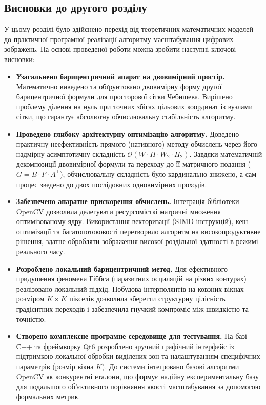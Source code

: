 \subsection{Висновки до другого розділу}

У цьому розділі було здійснено перехід від теоретичних математичних моделей до практичної програмної реалізації алгоритму масштабування цифрових зображень. На основі проведеної роботи можна зробити наступні ключові висновки:

\begin{itemize}
	\item \textbf{Узагальнено барицентричний апарат на двовимірний простір.} Математично виведено та обґрунтовано двовимірну форму другої барицентричної формули для просторової сітки Чебишева. Вирішено проблему ділення на нуль при точних збігах цільових координат із вузлами сітки, що гарантує абсолютну обчислювальну стабільність алгоритму.
	
	\item \textbf{Проведено глибоку архітектурну оптимізацію алгоритму.} Доведено практичну неефективність прямого (нативного) методу обчислень через його надмірну асимптотичну складність $\mathcal{O}(W \cdot H \cdot W_2 \cdot H_2)$. Завдяки математичній декомпозиції двовимірної формули та переходу до її матричного подання ($G = B \cdot F \cdot A^{\top}$), обчислювальну складність було кардинально знижено, а сам процес зведено до двох послідовних одновимірних проходів.
	
	\item \textbf{Забезпечено апаратне прискорення обчислень.} Інтеграція бібліотеки OpenCV дозволила делегувати ресурсомісткі матричні множення оптимізованому ядру. Використання векторизації (SIMD-інструкцій), кеш-оптимізації та багатопотоковості перетворило алгоритм на високопродуктивне рішення, здатне обробляти зображення високої роздільної здатності в режимі реального часу.
	
	\item \textbf{Розроблено локальний барицентричний метод.} Для ефективного придушення феномена Гіббса (паразитних осциляцій на різких контурах) реалізовано локальний підхід. Побудова інтерполянтів на ковзних вікнах розміром $K \times K$ пікселів дозволила зберегти структурну цілісність градієнтних переходів і забезпечила гнучкий компроміс між швидкістю та точністю.
	
	\item \textbf{Створено комплексне програмне середовище для тестування.} На базі С++ та фреймворку Qt6 розроблено зручний графічний інтерфейс із підтримкою локальної обробки виділених зон та налаштуванням специфічних параметрів (розмір вікна $K$). До системи інтегровано базові алгоритми OpenCV як конкурентні еталони, що формує надійну експериментальну базу для подальшого об'єктивного порівняння якості масштабування за допомогою формальних метрик.
\end{itemize}